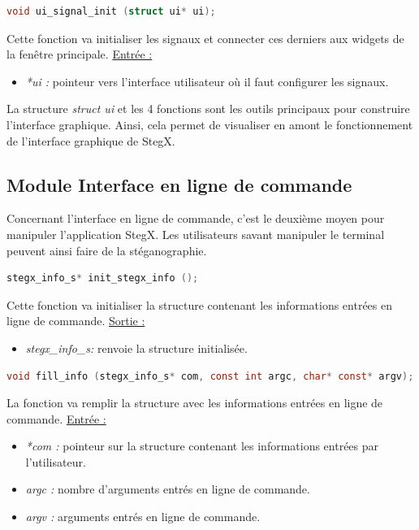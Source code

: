 \documentclass[11pt]{article}
\begin{document}
\begin{lstlisting}[language=c]
void ui_signal_init (struct ui* ui);
\end{lstlisting}

Cette fonction va initialiser les signaux et connecter ces derniers aux 
widgets de la fenêtre principale. 
\newline
\underline{Entrée :} 
\begin{itemize}
\item \textit{*ui :} pointeur vers l'interface utilisateur où il faut 
configurer les signaux. 
\newline 
\end{itemize}

La structure \textit{struct ui} et les 4 fonctions sont les outils principaux 
pour construire l'interface graphique. Ainsi, cela permet de visualiser 
en amont le fonctionnement de l'interface graphique de StegX. 

\subsection{Module Interface en ligne de commande}

Concernant l'interface en ligne de commande, c'est le deuxième moyen pour 
manipuler l'application StegX. Les utilisateurs savant manipuler le terminal 
peuvent ainsi faire de la stéganographie. 

\begin{lstlisting}[language=c]
stegx_info_s* init_stegx_info ();
\end{lstlisting}

Cette fonction va initialiser la structure contenant les informations 
entrées en ligne de commande. 
\newline
\underline{Sortie :} 
\begin{itemize}
\item \textit{stegx\_info\_s:} renvoie la structure initialisée. 
\newline 
\end{itemize}

\begin{lstlisting}[language=c]
void fill_info (stegx_info_s* com, const int argc, char* const* argv);
\end{lstlisting}

La fonction va remplir la structure avec les informations entrées en 
ligne de commande. 
\newline
\underline{Entrée :} 
\begin{itemize}
\item \textit{*com :} pointeur sur la structure contenant les informations 
entrées par l'utilisateur. 
\item \textit{argc :} nombre d'arguments entrés en ligne de commande. 
\item \textit{argv :} arguments entrés en ligne de commande. 
\newline 
\end{itemize}
\end{document}
